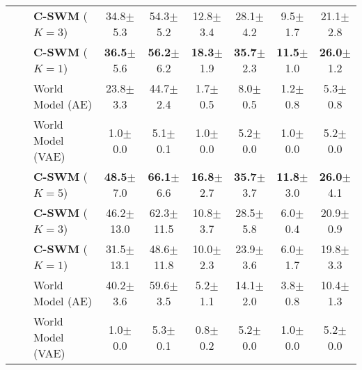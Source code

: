 \documentclass{article} %
\begin{document}
\begin{table}[ht]
\begin{adjustbox}{center,width=0.9\linewidth}
\begin{tabular}{lllcccccc}
&&{\bf C-SWM} ($K=3$)& 34.8{\color{lightgrey}\tiny$\pm$5.3}  & 54.3{\color{lightgrey}\tiny$\pm$5.2} & 12.8{\color{lightgrey}\tiny$\pm$3.4}  & 28.1{\color{lightgrey}\tiny$\pm$4.2} & 9.5{\color{lightgrey}\tiny$\pm$1.7}  & 21.1{\color{lightgrey}\tiny$\pm$2.8}\\
&&{\bf C-SWM} ($K=1$)& {\bf36.5}{\color{lightgrey}\tiny$\pm$5.6}  & {\bf56.2}{\color{lightgrey}\tiny$\pm$6.2} & {\bf18.3}{\color{lightgrey}\tiny$\pm$1.9}  & {\bf35.7}{\color{lightgrey}\tiny$\pm$2.3} & {\bf11.5}{\color{lightgrey}\tiny$\pm$1.0}  & {\bf26.0}{\color{lightgrey}\tiny$\pm$1.2}\\
&&World Model (AE) & 23.8{\color{lightgrey}\tiny$\pm$3.3}  & 44.7{\color{lightgrey}\tiny$\pm$2.4} & 1.7{\color{lightgrey}\tiny$\pm$0.5}  & 8.0{\color{lightgrey}\tiny$\pm$0.5} & 1.2{\color{lightgrey}\tiny$\pm$0.8}  & 5.3{\color{lightgrey}\tiny$\pm$0.8}\\
&&World Model (VAE) & 1.0{\color{lightgrey}\tiny$\pm$0.0}  & 5.1{\color{lightgrey}\tiny$\pm$0.1} & 1.0{\color{lightgrey}\tiny$\pm$0.0}  & 5.2{\color{lightgrey}\tiny$\pm$0.0} & 1.0{\color{lightgrey}\tiny$\pm$0.0}  & 5.2{\color{lightgrey}\tiny$\pm$0.0} \\
\midrule
\parbox[t]{0.1mm}{} & \parbox[t]{2mm}{}&{\bf C-SWM} ($K=5$)& {\bf 48.5}{\color{lightgrey}\tiny$\pm$7.0}  & {\bf 66.1}{\color{lightgrey}\tiny$\pm$6.6} & {\bf 16.8}{\color{lightgrey}\tiny$\pm$2.7}  & {\bf 35.7}{\color{lightgrey}\tiny$\pm$3.7} & {\bf 11.8}{\color{lightgrey}\tiny$\pm$3.0}  & {\bf 26.0}{\color{lightgrey}\tiny$\pm$4.1}\\
&&{\bf C-SWM} ($K=3$)& 46.2{\color{lightgrey}\tiny$\pm$13.0}  & 62.3{\color{lightgrey}\tiny$\pm$11.5} & 10.8{\color{lightgrey}\tiny$\pm$3.7}  & 28.5{\color{lightgrey}\tiny$\pm$5.8} & 6.0{\color{lightgrey}\tiny$\pm$0.4}  & 20.9{\color{lightgrey}\tiny$\pm$0.9}\\
&&{\bf C-SWM} ($K=1$)& 31.5{\color{lightgrey}\tiny$\pm$13.1}  & 48.6{\color{lightgrey}\tiny$\pm$11.8} & 10.0{\color{lightgrey}\tiny$\pm$2.3}  & 23.9{\color{lightgrey}\tiny$\pm$3.6} & 6.0{\color{lightgrey}\tiny$\pm$1.7}  & 19.8{\color{lightgrey}\tiny$\pm$3.3}\\
&&World Model (AE) & 40.2{\color{lightgrey}\tiny$\pm$3.6}  & 59.6{\color{lightgrey}\tiny$\pm$3.5} & 5.2{\color{lightgrey}\tiny$\pm$1.1}  & 14.1{\color{lightgrey}\tiny$\pm$2.0} & 3.8{\color{lightgrey}\tiny$\pm$0.8}  & 10.4{\color{lightgrey}\tiny$\pm$1.3}\\
&&World Model (VAE) & 1.0{\color{lightgrey}\tiny$\pm$0.0}  & 5.3{\color{lightgrey}\tiny$\pm$0.1} & 0.8{\color{lightgrey}\tiny$\pm$0.2}  & 5.2{\color{lightgrey}\tiny$\pm$0.0} & 1.0{\color{lightgrey}\tiny$\pm$0.0}  & 5.2{\color{lightgrey}\tiny$\pm$0.0}\\

\end{tabular}
\end{adjustbox}
\end{table}
\end{document}
